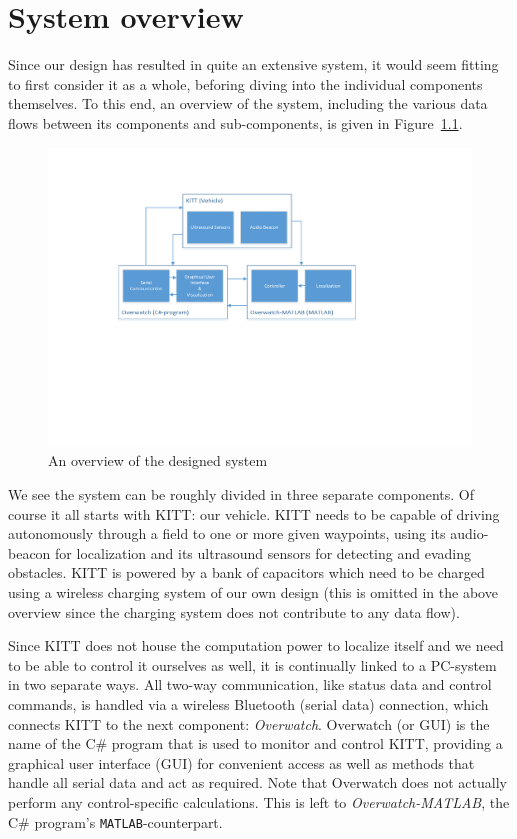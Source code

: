 \documentclass[11pt,titlepage]{report}
\begin{document}
\chapter{System overview}
\label{ch:system-overview}
Since our design has resulted in quite an extensive system, it would seem fitting to first consider it as a whole, beforing diving into the individual components themselves. To this end, an overview of the system, including the various data flows between its components and sub-components, is given in Figure~\ref{fig:system-overview}.

\begin{figure}[H]
	\centering
	\includegraphics[width=\linewidth]{resource/system-overview.pdf}
	\caption{An overview of the designed system}
	\label{fig:system-overview}
\end{figure}

We see the system can be roughly divided in three separate components. Of course it all starts with KITT: our vehicle. KITT needs to be capable of driving autonomously through a field to one or more given waypoints, using its audio-beacon for localization and its ultrasound sensors for detecting and evading obstacles. KITT is powered by a bank of capacitors which need to be charged using a wireless charging system of our own design (this is omitted in the above overview since the charging system does not contribute to any data flow).

Since KITT does not house the computation power to localize itself and we need to be able to control it ourselves as well, it is continually linked to a PC-system in two separate ways. All two-way communication, like status data and control commands, is handled via a wireless Bluetooth (serial data) connection, which connects KITT to the next component: \emph{Overwatch}. Overwatch (or GUI) is the name of the C\# program that is used to monitor and control KITT, providing a graphical user interface (GUI) for convenient access as well as methods that handle all serial data and act as required. Note that Overwatch does not actually perform any control-specific calculations. This is left to \emph{Overwatch-MATLAB}, the C\# program's \texttt{MATLAB}-counterpart.
\end{document}
